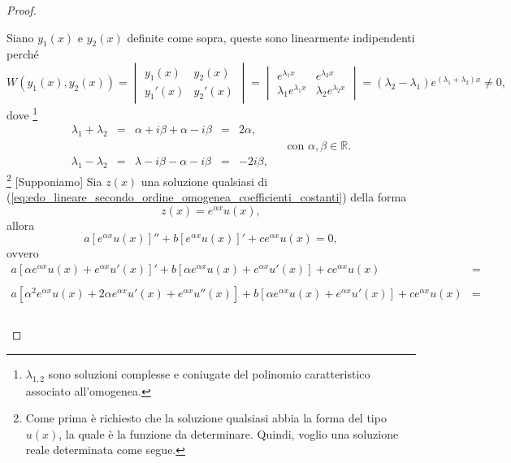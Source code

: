 \begin{proof}
\begin{enumerate}
		\noindent Siano $y_1(x)$ e $y_2(x)$ definite come sopra, queste sono linearmente indipendenti perché
		\begin{equation*}
				W(y_1(x),y_2(x)) = 
				\begin{vmatrix}
				y_1(x) & y_2(x)\\
				y_1'(x) & y_2'(x)
			\end{vmatrix} = 
			\begin{vmatrix}
				e^{\lambda_1x} & e^{\lambda_2 x}\\
				\lambda_1 e^{\lambda_1x} & \lambda_2 e^{\lambda_2 x}
			\end{vmatrix} = (\lambda_2 -\lambda_1) e^{(\lambda_1+\lambda_2)x}\neq 0,
		\end{equation*}
		dove \footnote{$\lambda_{1,2}$ sono soluzioni complesse e coniugate del polinomio caratteristico associato all'omogenea.}
		\begin{equation*}
			\begin{matrix}
				\lambda_1 + \lambda_2 &=& \alpha + i\beta + \alpha - i\beta &=& 2 \alpha,\\
				&&&&&&\text{con } \alpha,\beta\in\mathbb{R}.\\
				\lambda_1 - \lambda_2 &=& \lambda - i\beta - \alpha - i\beta &=& - 2i\beta,
			\end{matrix}
		\end{equation*}
		\footnote{Come prima è richiesto che la soluzione qualsiasi abbia la forma del tipo $u(x)$, la quale è la funzione da determinare. Quindi, voglio una soluzione reale determinata come segue.} [Supponiamo] Sia $z(x)$ una soluzione qualsiasi di (\ref{eq:edo_lineare_secondo_ordine_omogenea_coefficienti_costanti}) della forma
		\begin{equation*}
			z(x) = e^{\alpha x} u(x),
		\end{equation*}
		allora
		\begin{equation*}
				a[e^{\alpha x} u(x)]'' + b [e^{\alpha x} u(x)]' + c e^{\alpha x} u(x) = 0,
		\end{equation*}
		ovvero
		\begin{equation*}
			\begin{matrix}
				a [\alpha e^{\alpha x}u(x) + e^{\alpha x}u'(x)]' + b [\alpha e^{\alpha x}u(x) + e^{\alpha x}u'(x)] + c e^{\alpha x}u(x)&=&\\\\
				a[\alpha^2e^{\alpha x}u(x) + 2\alpha e^{\alpha x} u'(x) + e^{\alpha x}u''(x)] + b [\alpha e^{\alpha x}u(x) + e^{\alpha x}u'(x)] + c e^{\alpha x}u(x) &=&\\\\

\end{matrix}
\end{equation*}
\end{enumerate}
\end{proof}

